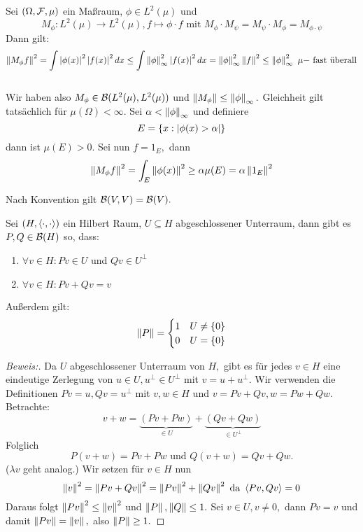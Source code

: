 \begin{ex}[Multiplikationsoperatoren] \label{Mult_op}
    Sei $(\Omega, \mathcal{F}, \mu)$ ein Maßraum, $\phi \in L^2(\mu)$ und \[M_{\phi}: L^2(\mu) \to L^2(\mu), f \mapsto \phi \cdot f \text{ mit } M_{\phi} \cdot M_{\psi} = M_{\psi} \cdot M_{\phi} = M_{\phi \cdot \psi}\] Dann gilt:
    \[\left\lVert M_{\phi}f\right\rVert^2 = \int \left\lvert \phi(x) \right\rvert^2 \left\lvert f(x) \right\rvert^2dx \leq \int \left\lVert\phi\right\rVert_\infty^2 \left\lvert f(x) \right\rvert^2dx = \left\lVert\phi\right\rVert_\infty^2\left\lVert f\right\rVert^2 \leq \left\lVert\phi\right\rVert_\infty^2 \text{ $\mu-$ fast überall}\] \\ Wir haben also $M_{\phi} \in \mathcal{B}(L^2(\mu), L^2(\mu))$ und $\left\lVert M_{\phi}\right\rVert \leq \left\lVert\phi\right\rVert_\infty.$ Gleichheit gilt tatsächlich für $\mu(\Omega) < \infty.$ Sei $\alpha < \left\lVert\phi\right\rVert_\infty$ und definiere
    \[E = \left\{x: \left\lvert \phi(x) > \alpha \right\rvert\right\}\]
    dann ist $\mu(E)>0.$ Sei nun $f = 1_E,$ dann 
    \[\left\lVert M_{\phi}f\right\rVert^2 = \int_E \left\lVert\phi(x)\right\rVert^2 \geq \alpha \mu(E) = \alpha \left\lVert1_E\right\rVert^2\]
\end{ex}

\begin{rem}
    Nach Konvention gilt $\mathcal{B}(V, V) = \mathcal{B}(V).$
\end{rem}

\begin{theorem}
    Sei $(H, \left\langle\cdot, \cdot\right\rangle)$ ein Hilbert Raum, $U \subseteq H$ abgeschlossener Unterraum, dann gibt es $P, Q \in \mathcal{B}(H)$ so, dass:
    \label{PQ_Zerlegung}
    \begin{enumerate}
        \item $\forall v \in H: Pv \in U$ und $Qv \in U^{\perp}$
        \item $\forall v \in H: Pv + Qv = v$
    \end{enumerate}
    Außerdem gilt: 
    \[\left\lVert P\right\rVert = \begin{cases} 1 & U \not= \left\{0\right\} \\
    0 & U = \left\{0\right\}
    \end{cases}\]
    
    \begin{proof}[Beweis:] Da $U$ abgeschlossener Unterraum von $H,$ gibt es für jedes $v \in H$ eine eindeutige Zerlegung von $u \in U, u^{\perp} \in U^{\perp}$ mit $v = u + u^{\perp}.$ Wir verwenden die Definitionen $Pv = u, Qv = u^{\perp}$ mit $v, w \in H$ und $v = Pv + Qv, w = Pw + Qw.$ Betrachte: \[v + w = \underbrace{(Pv + Pw)}_{\in U} + \underbrace{(Qv + Qw)}_{\in U^{\perp}}\]
    Folglich \[P(v + w) = Pv + Pw \text{ und } Q(v+w) = Qv + Qw.\] ($\lambda v$ geht analog.) Wir setzen für $v \in H$ nun 
    \[\left\lVert v\right\rVert^2 = \left\lVert Pv + Qv\right\rVert^2 = \left\lVert Pv\right\rVert^2 + \left\lVert Qv\right\rVert^2 \text{ da } \left\langle Pv, Qv\right\rangle = 0\] Daraus folgt $\left\lVert Pv\right\rVert^2 \leq \left\lVert v\right\rVert^2$ und $\left\lVert P\right\rVert, \left\lVert Q\right\rVert \leq 1.$ Sei $v \in U, v \not= 0,$ dann $Pv = v$ und damit $\left\lVert Pv\right\rVert = \left\lVert v\right\rVert,$ also $\left\lVert P\right\rVert \geq 1.$
    \end{proof}
\end{theorem}

